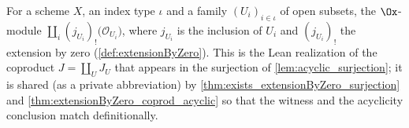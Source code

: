 \begin{definition}\leanok
[The extension-by-zero coproduct $J = \coprod_U J_U$]
  \label{def:extensionByZeroCoprod}
  For a scheme $X$, an index type $\iota$ and a family $(U_i)_{i\in\iota}$ of open
  subsets, the $\Ox$-module
  $\coprod_{i} (j_{U_i})_!\bigl(\mathcal{O}_{U_i}\bigr)$, where
  $j_{U_i}$ is the inclusion of $U_i$ and $(j_{U_i})_!$ the extension by zero
  (\cref{def:extensionByZero}). This is the Lean realization of the coproduct
  $J = \coprod_U J_U$ that appears in the surjection of \cref{lem:acyclic_surjection};
  it is shared (as a private abbreviation) by \cref{thm:exists_extensionByZero_surjection}
  and \cref{thm:extensionByZero_coprod_acyclic} so that the witness and the acyclicity
  conclusion match definitionally.
\end{definition}

